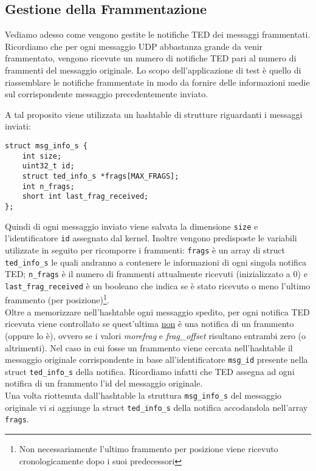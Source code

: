 \documentclass[a4paper,10pt]{article}
\begin{document}
\subsection{Gestione della Frammentazione}
\label{subsec:frag}
Vediamo adesso come vengono gestite le notifiche TED dei messaggi
frammentati. Ricordiamo che per ogni messaggio UDP abbastanza grande da
venir frammentato, vengono ricevute un numero di notifiche TED pari al
numero di frammenti del messaggio originale. Lo scopo dell'applicazione
di test è quello di riassemblare le notifiche frammentate in modo da
fornire delle informazioni medie sul corrispondente messaggio
precedentemente inviato.

A tal proposito viene utilizzata un hashtable di strutture riguardanti i
messaggi inviati:
\begin{lstlisting}
struct msg_info_s {
	int size;
	uint32_t id;
	struct ted_info_s *frags[MAX_FRAGS];
	int n_frags;
	short int last_frag_received;
};
\end{lstlisting}

Quindi di ogni messaggio inviato viene salvata la dimensione
\texttt{size} e l'identificatore \texttt{id} assegnato dal
kernel. Inoltre vengono predisposte le variabili utilizzate in seguito
per ricomporre i frammenti: \texttt{frags} è un array di struct
\texttt{ted\_info\_s} le quali andranno a contenere le informazioni di
ogni singola notifica TED; \texttt{n\_frags} è il numero di frammenti
attualmente ricevuti (inizializzato a 0) e \texttt{last\_frag\_received}
è un booleano che indica se è stato ricevuto o meno l'ultimo frammento
(per posizione)\footnote{Non necessariamente l'ultimo frammento per
posizione viene ricevuto cronologicamente dopo i suoi predecessori}.\\

Oltre a memorizzare nell'hashtable ogni messaggio spedito, 
per ogni notifica TED ricevuta viene controllato se quest'ultima \underline{non} è
 una
notifica di un frammento (oppure lo è), ovvero se i valori \emph{morefrag}
e \emph{frag\_offset} risultano entrambi zero (o altrimenti).
Nel caso in cui fosse un frammento viene cercata nell'hashtable il
messaggio originale corrispondente in base all'identificatore
\texttt{msg\_id} presente nella struct \texttt{ted\_info\_s} della
notifica. Ricordiamo infatti che TED assegna ad ogni notifica
di un frammento l'id del messaggio originale.\\

Una volta riottenuta dall'hashtable la struttura \texttt{msg\_info\_s} del
messaggio
originale vi si aggiunge la struct \texttt{ted\_info\_s} della notifica
accodandola nell'array \texttt{frags}.
\end{document}
